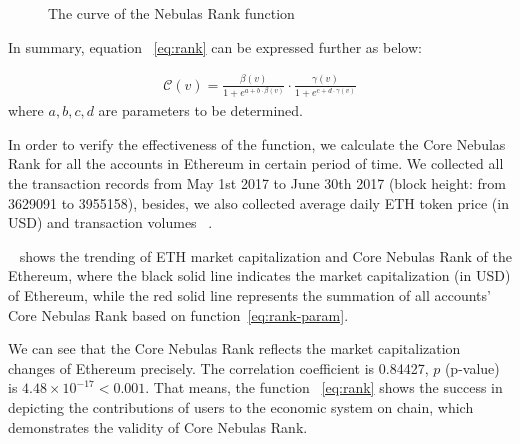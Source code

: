 \begin{figure}
\centering
{}
\caption{The curve of the Nebulas Rank function \label{fig-nr}}
\end{figure}


\vspace{2em}
In summary, equation ~\ref{eq:rank} can be expressed further as below:

\begin{align}
\label{eq:rank-param}
\mathcal{C}(v) =  \frac{\beta(v)}{1+e^{a + b \cdot \beta(v)}} \cdot \frac{\gamma(v)}{1+e^{c + d \cdot \gamma(v)}}
\end{align}
\noindent where $a, b, c, d$ are parameters to be determined.


In order to verify the effectiveness of the function, we calculate the Core Nebulas Rank for all the accounts in Ethereum in certain period of time. We collected all the transaction records from May 1st 2017 to June 30th 2017 (block height: from 3629091 to 3955158), besides, we also collected average daily ETH token price (in USD) and transaction volumes ~\cite{coinmarketcap}.

~ shows the trending of ETH market capitalization and Core Nebulas Rank of the Ethereum, where the black solid line indicates the market capitalization (in USD) of Ethereum, while the red solid line represents the summation of all accounts' Core Nebulas Rank based on function~\ref{eq:rank-param}.

We can see that the Core Nebulas Rank reflects the market capitalization changes of Ethereum precisely. The correlation coefficient is 0.84427, $p$ (p-value) is $4.48\times{}10^{-17}<0.001$. That means, the function ~\ref{eq:rank} shows the success in depicting the contributions of users to the economic system on chain, which demonstrates the validity of Core Nebulas Rank. 


